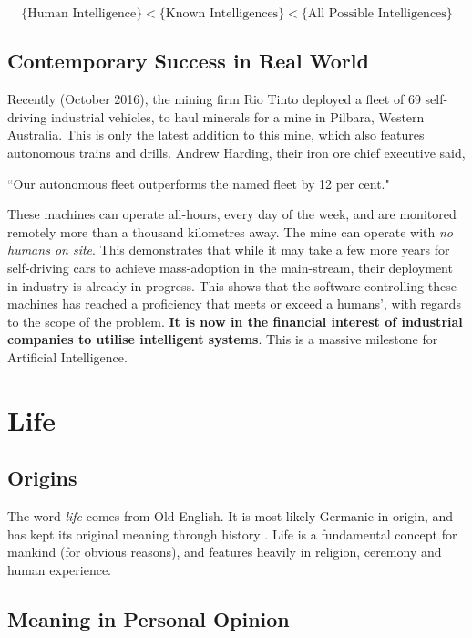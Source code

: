 \documentclass[10pt,a4paper]{article}
\begin{document}
				\medskip
				\[
				\text{\{Human Intelligence\}}<\text{\{Known Intelligences\}}<\text{\{All Possible Intelligences\}}
				\]
		
			\subsection{Contemporary Success in Real World}
				
				Recently (October 2016), the mining firm Rio Tinto deployed a fleet of 69 self-driving industrial vehicles, to haul minerals for a mine in Pilbara, Western Australia. This is only the latest addition to this mine, which also features autonomous trains and drills. Andrew Harding, their iron ore chief executive said, 
				
				\begin{center}
					``Our autonomous fleet outperforms the named fleet by 12 per cent."	
				\end{center}

				 These machines can operate all-hours, every day of the week, and are monitored remotely more than a thousand kilometres away. The mine can operate with \textsl{no humans on site}. This demonstrates that while it may take a few more years for self-driving cars to achieve mass-adoption in the main-stream, their deployment in industry is already in progress. This shows that the software controlling these machines has reached a proficiency that meets or exceed a humans', with regards to the scope of the problem. \textbf{It is now in the financial interest of industrial companies to utilise intelligent systems}. This is a massive milestone for Artificial Intelligence.
		
		\bigskip
		
		\pagebreak
		\section{Life}
		
			\subsection{Origins}
		
				The word \textsl{life} comes from Old English. It is most likely Germanic in origin, and has kept its original meaning through history \cites{etymonline2017}. Life is a fundamental concept for mankind (for obvious reasons), and features heavily in religion, ceremony and human experience.
	
			\subsection{Meaning in Personal Opinion}
	
\end{document}
